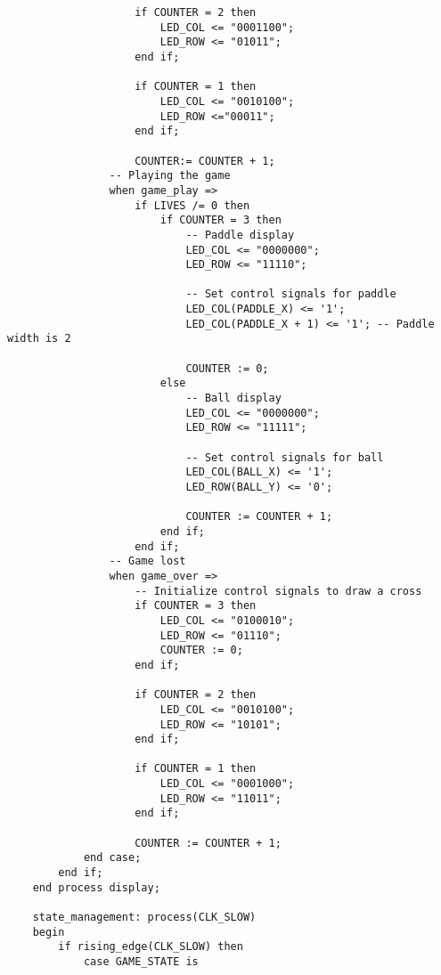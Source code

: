 \begin{verbatim}
                    if COUNTER = 2 then
                        LED_COL <= "0001100";
                        LED_ROW <= "01011";
                    end if;
                      
                    if COUNTER = 1 then
                        LED_COL <= "0010100";
                        LED_ROW <="00011";
                    end if;

                    COUNTER:= COUNTER + 1;
                -- Playing the game
                when game_play =>
                    if LIVES /= 0 then
                        if COUNTER = 3 then
                            -- Paddle display
                            LED_COL <= "0000000"; 
                            LED_ROW <= "11110";

                            -- Set control signals for paddle
                            LED_COL(PADDLE_X) <= '1';
                            LED_COL(PADDLE_X + 1) <= '1'; -- Paddle width is 2

                            COUNTER := 0;
                        else
                            -- Ball display
                            LED_COL <= "0000000"; 
                            LED_ROW <= "11111";

                            -- Set control signals for ball
                            LED_COL(BALL_X) <= '1';
                            LED_ROW(BALL_Y) <= '0';

                            COUNTER := COUNTER + 1;
                        end if;
                    end if;
                -- Game lost  
                when game_over =>
                    -- Initialize control signals to draw a cross
                    if COUNTER = 3 then
                        LED_COL <= "0100010";
                        LED_ROW <= "01110";
                        COUNTER := 0;
                    end if;
                    
                    if COUNTER = 2 then
                        LED_COL <= "0010100";
                        LED_ROW <= "10101";								
                    end if;

                    if COUNTER = 1 then
                        LED_COL <= "0001000";
                        LED_ROW <= "11011";
                    end if;
                    
                    COUNTER := COUNTER + 1;
            end case;
        end if;
    end process display;
	 
    state_management: process(CLK_SLOW)
    begin
        if rising_edge(CLK_SLOW) then
            case GAME_STATE is
            

\end{verbatim}

